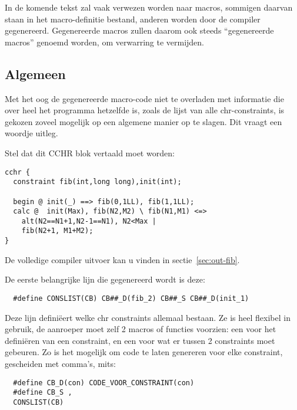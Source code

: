 In de komende tekst zal vaak verwezen worden naar macros, sommigen daarvan staan in het macro-definitie bestand, anderen worden door de compiler gegenereerd. Gegenereerde macros zullen daarom ook steeds ``gegenereerde macros'' genoemd worden, om verwarring te vermijden.

\subsection{Algemeen} \label{sec:gencode-alg}

Met het oog de gegenereerde macro-code niet te overladen met informatie die over heel het programma hetzelfde is, zoals de lijst van alle chr-constraints, is gekozen zoveel mogelijk op een algemene manier op te slagen. Dit vraagt een woordje uitleg.

Stel dat dit CCHR blok vertaald moet worden: \begin{Verbatim}
cchr {
  constraint fib(int,long long),init(int);

  begin @ init(_) ==> fib(0,1LL), fib(1,1LL);
  calc @  init(Max), fib(N2,M2) \ fib(N1,M1) <=>
    alt(N2==N1+1,N2-1==N1), N2<Max |
    fib(N2+1, M1+M2);
}
\end{Verbatim}
De volledige compiler uitvoer kan u vinden in sectie~\ref{sec:out-fib}.

De eerste belangrijke lijn die gegenereerd wordt is deze: 
\begin{Verbatim}
  #define CONSLIST(CB) CB##_D(fib_2) CB##_S CB##_D(init_1)
\end{Verbatim}
Deze lijn defini\"eert welke chr constraints allemaal bestaan. Ze is heel flexibel in gebruik, de aanroeper moet zelf 2 macros of functies voorzien: een voor het defini\"eren van een constraint, en een voor wat er tussen 2 constraints moet gebeuren. Zo is het mogelijk om code te laten genereren voor elke constraint, gescheiden met comma's, mits: \begin{Verbatim}
  #define CB_D(con) CODE_VOOR_CONSTRAINT(con)
  #define CB_S ,
  CONSLIST(CB)
\end{Verbatim}

